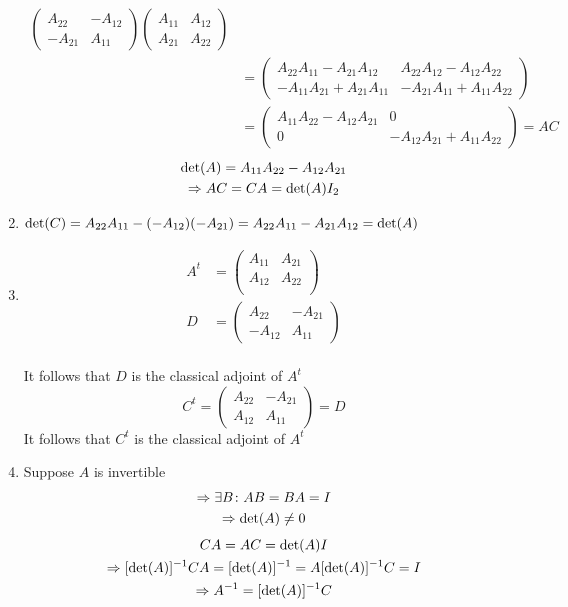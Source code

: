 \begin{enumerate}
\begin{align}
\begin{pmatrix}
A_{22} & - A_{12}\\
-A_{21} & A_{11}
\end{pmatrix}
\begin{pmatrix}
A_{11} & A_{12}\\
A_{21} & A_{22}
\end{pmatrix}\\
&= \begin{pmatrix}
A_{22}A_{11}-A_{21}A_{12} & A_{22}A_{12} -A_{12}A_{22} \\
-A_{11}A_{21} + A_{21}A_{11} & -A_{21}A_{11} +A_{11}A_{22}
\end{pmatrix}\\
&= \begin{pmatrix}
A_{11}A_{22} -A_{12}A_{21} &  0\\ 
0 & -A_{12}A_{21} + A_{11}A_{22}
\end{pmatrix}
=AC
\end{align}
\begin{gather}
\text{det}({A}) = A_{11}A_{22} - A_{12}A_{21}\\
\Rightarrow AC = CA = \text{det}({A})I_2
\end{gather}
\item $\text{det}({C}) = A_{22}A_{11} -(-A_{12})(-A_{21}) =
  A_{22}A_{11}-A_{21}A_{12} =\text{det}({A})$
\item
\begin{align}
A^t &= \begin{pmatrix}
A_{11}  & A_{21}\\
A_{12}  & A_{22}\\
\end{pmatrix}\\
D &= \begin{pmatrix}
A_{22} & -A_{21}\\
-A_{12} & A_{11}
\end{pmatrix}
\end{align}
\paragraph{}It follows that $D$ is the classical adjoint of $A^t$
\begin{equation}
C^t = \begin{pmatrix}
A_{22} & -A_{21}\\
A_{12} & A_{11}
\end{pmatrix} = D
\end{equation}
It follows that $C^t$ is the classical adjoint of $A^t$
\item Suppose $A$ is invertible
\begin{gather}
\Rightarrow \exists B \colon AB = BA = I\\
\Rightarrow \text{det}({A}) \neq 0 
\end{gather}
\begin{gather}
CA =AC = \text{det}({A})I\\
\Rightarrow [\text{det}({A})]^{-1}CA  = [\text{det}({A})]^{-1} = A[\text{det}({A})]^{-1}C =
I\\
\Rightarrow A^{-1} = [\text{det}({A})]^{-1}C
\end{gather}
\end{enumerate}
